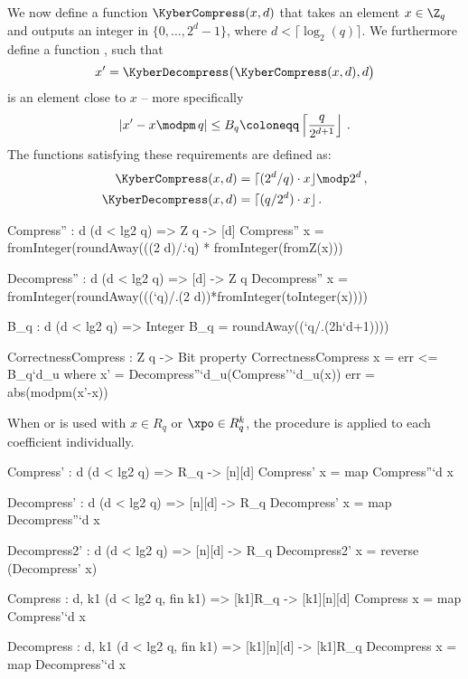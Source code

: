 We now define a function $\KyberCompress(x,d)$ that takes an element $x\in\Z_q$ and outputs an integer in $\{0,\dots,2^d-1\}$,
where $d<\lceil \log_2(q) \rceil$. We furthermore define a function \KyberDecompress, such that
\begin{equation}\label{eq:xprime}
x' = \KyberDecompress\big(\KyberCompress(x,d),d\big)
\end{equation}
is an element close to $x$ -- more specifically
\begin{equation}\label{eq:Bq} 
|x'-x\modpm\, q|\leq B_q\coloneqq \left\lceil \frac{q}{2^{d+1}}\right\rfloor\,.
\end{equation}
The functions satisfying these requirements are defined as:
\begin{align*}
  \KyberCompress(x,d)   &= \lceil (2^d/q)\cdot x \rfloor \modp 2^d\,,\\
  \KyberDecompress(x,d) &= \lceil (q/2^d)\cdot x \rfloor\,.
\end{align*}

\begin{code}
  Compress'' : {d} (d < lg2 q) => Z q -> [d]
  Compress'' x = fromInteger(roundAway(((2^^`d)/.`q) * fromInteger(fromZ(x))) %

  Decompress'' : {d} (d < lg2 q) => [d] -> Z q 
  Decompress'' x = fromInteger(roundAway(((`q)/.(2^^`d))*fromInteger(toInteger(x))))

  B_q : {d} (d < lg2 q) => Integer
  B_q = roundAway((`q/.(2^^(`d+1))))

  CorrectnessCompress : Z q -> Bit
  property CorrectnessCompress x = err <= B_q`{d_u} where
    x' = Decompress''`{d_u}(Compress''`{d_u}(x))
    err = abs(modpm(x'-x))
\end{code}

When \KyberCompress or \KyberDecompress is used with $x \in R_q$ or $\xpo \in R_q^k$, 
the procedure is applied to each coefficient individually.

\begin{code}
  Compress' : {d} (d < lg2 q) => R_q -> [n][d]
  Compress' x = map Compress''`{d} x
  
  Decompress' : {d} (d < lg2 q) => [n][d] -> R_q
  Decompress' x = map Decompress''`{d} x

  
  Decompress2' : {d} (d < lg2 q) => [n][d] -> R_q
  Decompress2' x = reverse (Decompress' x)

  Compress : {d, k1} (d < lg2 q, fin k1) => [k1]R_q -> [k1][n][d]
  Compress x = map Compress'`{d} x
  
  Decompress : {d, k1} (d < lg2 q, fin k1) => [k1][n][d] -> [k1]R_q
  Decompress x = map Decompress'`{d} x
\end{code}


